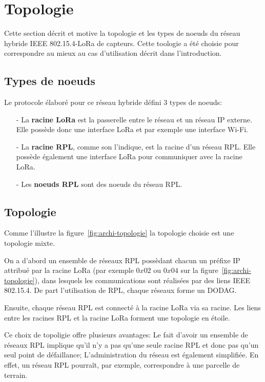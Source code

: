 \section{Topologie}\label{sec:archi-topologie}
\renewcommand{\rightmark}{Topologie}

Cette section décrit et motive la topologie et les types de noeuds du réseau hybride IEEE 802.15.4-LoRa de capteurs. Cette toologie a été choisie pour correspondre au mieux au cas d'utilisation décrit dans l'introduction.

\subsection*{Types de noeuds}
    Le protocole élaboré pour ce réseau hybride défini 3 types de noeuds:
    \begin{itemize}
        \item[-] La \textbf{racine LoRa} est la passerelle entre le réseau et un réseau IP externe. Elle possède donc une interface LoRa et par exemple une interface Wi-Fi.
        \item[-] La \textbf{racine RPL}, comme son l'indique, est la racine d'un réseau RPL. Elle possède également une interface LoRa pour communiquer avec la racine LoRa.
        \item[-] Les \textbf{noeuds RPL} sont des noeuds du réseau RPL.
    \end{itemize}

\subsection*{Topologie}
Comme l'illustre la figure~\ref{fig:archi-topologie} la topologie choisie est une topologie mixte.

On a d'abord un ensemble de réseaux RPL possèdant chacun un préfixe IP attribué par la racine LoRa (par exemple $0x02$ ou $0x04$ sur la figure~\ref{fig:archi-topologie}), dans lesquels les communications sont réalisées par des liens IEEE 802.15.4.
De part l'utilisation de RPL, chaque réseaux forme un DODAG.

Ensuite, chaque réseau RPL est connecté à la racine LoRa via sa racine. Les liens entre les racines RPL et la racine LoRa forment une topologie en étoile.

Ce choix de topoligie offre plusieurs avantages: Le fait d'avoir un ensemble de réseaux RPL implique qu'il n'y a pas qu'une seule racine RPL et donc pas qu'un seul point de défaillance; L'administration du réseau est également simplifiée. En effet, un réseau RPL pourraît, par exemple, correspondre à une parcelle de terrain. 

